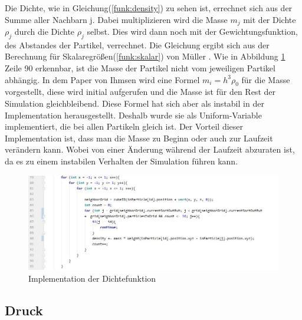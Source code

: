 \documentclass[intern,palatino]{cgBA}
\begin{document}
Die Dichte, wie in Gleichung(\ref{funk:density}) zu sehen ist, errechnet sich aus der Summe aller Nachbarn j. Dabei multiplizieren wird die Masse $m_j$ mit der Dichte $\rho_j$ durch die Dichte $\rho_j$ selbst. Dies wird dann noch mit der Gewichtungsfunktion, des Abstandes der Partikel, verrechnet. Die Gleichung ergibt sich aus der Berechnung für Skalaregrößen(\ref{funk:skalar}) von Müller \cite{muller2003particle}.
\newline\newline
Wie in Abbildung \ref{img:dichte} Zeile 90 erkennbar, ist die Masse der Partikel nicht vom jeweiligen Partikel abhängig. In dem Paper von Ihmsen \cite{ihmsen2014sph} wird eine Formel $m_i = h^3 \rho_0$ für die Masse vorgestellt, diese wird initial aufgerufen und die Masse ist für den Rest der Simulation gleichbleibend. Diese Formel hat sich aber als instabil in der Implementation herausgestellt. Deshalb wurde sie als Uniform-Variable implementiert, die bei allen Partikeln gleich ist. Der Vorteil dieser Implementation ist, dass man die Masse zu Beginn oder auch zur Laufzeit verändern kann. Wobei von einer Änderung während der Laufzeit abzuraten ist, da es zu einem instabilen Verhalten der Simulation führen kann.
\newline

\begin{figure}[H]
	\centering
	\includegraphics[width=1.35\columnwidth]{Bilder/dichte.jpg}
	\caption{Implementation der Dichtefunktion}
	\label{img:dichte}
\end{figure}


\subsection{Druck}\label{druch}
\end{document}
